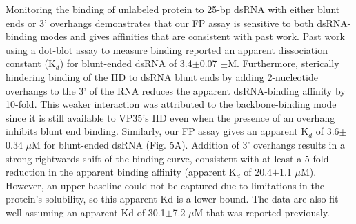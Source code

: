 \documentclass[../main.tex]{subfiles}
\begin{document}
        Monitoring the binding of unlabeled protein to 25-bp dsRNA with either blunt ends or 3’ overhangs demonstrates that our FP assay is sensitive to both dsRNA-binding modes and gives affinities that are consistent with past work. Past work using a dot-blot assay to measure binding reported an apparent dissociation constant (K$_d$) for blunt-ended dsRNA of 3.4$\pm$0.07 $\pm$M\cite{edwards_differential_2016}. Furthermore, sterically hindering binding of the IID to dsRNA blunt ends by adding 2-nucleotide overhangs to the 3’ of the RNA reduces the apparent dsRNA-binding affinity by 10-fold\cite{ramanan_structural_2012}. This weaker interaction was attributed to the backbone-binding mode since it is still available to VP35’s IID even when the presence of an overhang inhibits blunt end binding. Similarly, our FP assay gives an apparent K$_d$ of 3.6$\pm$0.34 $\mu$M for blunt-ended dsRNA (Fig. 5A). Addition of 3’ overhangs results in a strong rightwards shift of the binding curve, consistent with at least a 5-fold reduction in the apparent binding affinity (apparent K$_d$ of 20.4$\pm$1.1 $\mu$M). However, an upper baseline could not be captured due to limitations in the protein’s solubility, so this apparent Kd is a lower bound. The data are also fit well assuming an apparent Kd of 30.1$\pm$7.2 $\mu$M that was reported previously\cite{ramanan_structural_2012}.
\end{document}
